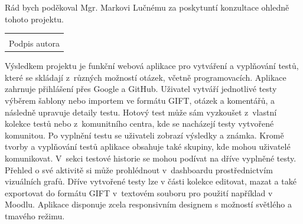 \documentclass[12pt, a4paper,
openright
]{report}
\newcommand\datumOdevzdani{1. 1. 2024} %
\begin{document}
\cleardoublepage %
	

	
	\noindent Rád bych poděkoval Mgr. Markovi Lučnému za poskytuntí konzultace ohledně tohoto projektu.
	
	\vspace*{0.7\textheight} %

	\vfill
	\noindent{V Opavě \datumOdevzdani\\}
	\noindent
	\begin{minipage}{\linewidth}
		\hspace{9.5cm} 
		\begin{tabular}{@{}p{6cm}@{}}
			\dotfill \\
			Podpis autora
		\end{tabular}
	\end{minipage}
	
	\cleardoublepage %


	\noindent Výsledkem projektu je funkční webová aplikace pro vytváření a vyplňování testů, které se skládají z~různých možností otázek, včetně programovacích. Aplikace zahrnuje přihlášení přes Google a GitHub. Uživatel vytváří jednotlivé testy výběrem šablony nebo importem ve formátu GIFT, otázek a komentářů, a následně upravuje detaily testu. Hotový test může sám vyzkoušet z~vlastní kolekce testů nebo z~komunitního centra, kde se nacházejí testy vytvořené komunitou. Po vyplnění testu se uživateli zobrazí výsledky a známka. Kromě tvorby a vyplňování testů aplikace obsahuje také skupiny, kde mohou uživatelé komunikovat. V~sekci testové historie se mohou podívat na dříve vyplněné testy. Přehled o své aktivitě si může prohlédnout v~dashboardu prostřednictvím vizuálních grafů. Dříve vytvořené testy lze v části kolekce editovat, mazat a také exportovat do formátu GIFT v~textovém souboru pro použití například v Moodlu. Aplikace disponuje zcela responsivním designem s možností světlého a tmavého režimu.
	
\end{document}
